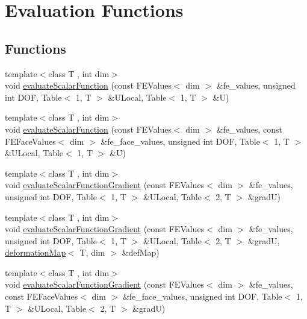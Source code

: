 \section{Evaluation Functions}
\label{group___evaluation_functions}
\subsection*{Functions}
\begin{DoxyCompactItemize}
\item 
{\footnotesize template$<$class T , int dim$>$ }\\void \mbox{\hyperlink{group___evaluation_functions_ga399ae2353249293211c021848a64175c}{evaluate\+Scalar\+Function}} (const F\+E\+Values$<$ dim $>$ \&fe\+\_\+values, unsigned int D\+OF, Table$<$ 1, T $>$ \&U\+Local, Table$<$ 1, T $>$ \&U)
\item 
{\footnotesize template$<$class T , int dim$>$ }\\void \mbox{\hyperlink{group___evaluation_functions_ga2e2fbeb2173113c6889c73bbb7304789}{evaluate\+Scalar\+Function}} (const F\+E\+Values$<$ dim $>$ \&fe\+\_\+values, const F\+E\+Face\+Values$<$ dim $>$ \&fe\+\_\+face\+\_\+values, unsigned int D\+OF, Table$<$ 1, T $>$ \&U\+Local, Table$<$ 1, T $>$ \&U)
\item 
{\footnotesize template$<$class T , int dim$>$ }\\void \mbox{\hyperlink{group___evaluation_functions_ga3ee6127c2c5c8333bb7fb384dcdb431f}{evaluate\+Scalar\+Function\+Gradient}} (const F\+E\+Values$<$ dim $>$ \&fe\+\_\+values, unsigned int D\+OF, Table$<$ 1, T $>$ \&U\+Local, Table$<$ 2, T $>$ \&gradU)
\item 
{\footnotesize template$<$class T , int dim$>$ }\\void \mbox{\hyperlink{group___evaluation_functions_gabeb71201e8213a7c7616cd8824617f73}{evaluate\+Scalar\+Function\+Gradient}} (const F\+E\+Values$<$ dim $>$ \&fe\+\_\+values, unsigned int D\+OF, Table$<$ 1, T $>$ \&U\+Local, Table$<$ 2, T $>$ \&gradU, \mbox{\hyperlink{structdeformation_map}{deformation\+Map}}$<$ T, dim $>$ \&def\+Map)
\item 
{\footnotesize template$<$class T , int dim$>$ }\\void \mbox{\hyperlink{group___evaluation_functions_ga4622566d0fe19b017cf8d2643ffeb47a}{evaluate\+Scalar\+Function\+Gradient}} (const F\+E\+Values$<$ dim $>$ \&fe\+\_\+values, const F\+E\+Face\+Values$<$ dim $>$ \&fe\+\_\+face\+\_\+values, unsigned int D\+OF, Table$<$ 1, T $>$ \&U\+Local, Table$<$ 2, T $>$ \&gradU)

\end{DoxyCompactItemize}
